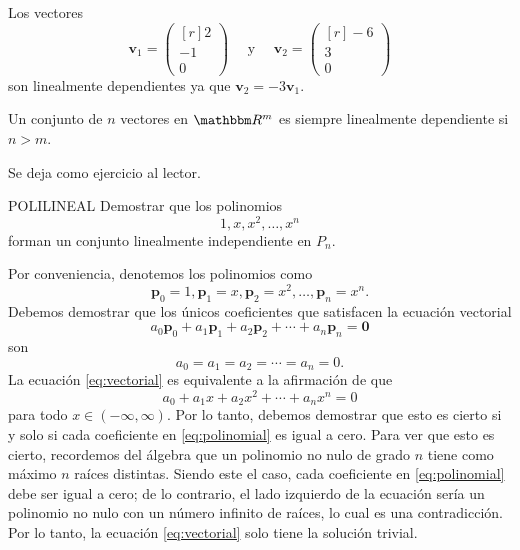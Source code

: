 \begin{examplebox}{}{}
    Los vectores
    $$\mathbf{v}_1 = \begin{pmatrix*}[r] 2 \\ -1 \\ 0 \end{pmatrix*} \quad \text{ y } \quad \mathbf{v}_2 = \begin{pmatrix*}[r] -6 \\ 3 \\ 0 \end{pmatrix*}$$
    son linealmente dependientes ya que $\mathbf{v}_2 = -3\mathbf{v}_1$.
\end{examplebox}

\begin{theorem}{}{}
    Un conjunto de $n$ vectores en $\RR[m]$ es siempre linealmente dependiente si $n > m$.

    \tcblower
    \demostracion Se deja como ejercicio al lector.
\end{theorem}

\begin{examplebox}{}{POLILINEAL}
    Demostrar que los polinomios
    $$1, x, x^2, \dots, x^n$$
    forman un conjunto linealmente independiente en $P_n$.

    \tcblower
    \solucion Por conveniencia, denotemos los polinomios como
    $$\mathbf{p}_0 = 1, \mathbf{p}_1 = x, \mathbf{p}_2 = x^2, \dots, \mathbf{p}_n = x^n.$$
    Debemos demostrar que los únicos coeficientes que satisfacen la ecuación vectorial
    \begin{equation}
        a_0\mathbf{p}_0 + a_1\mathbf{p}_1 + a_2\mathbf{p}_2 + \cdots + a_n\mathbf{p}_n = \mathbf{0} \label{eq:vectorial}
    \end{equation}
    son
    $$a_0 = a_1 = a_2 = \cdots = a_n = 0.$$
    La ecuación \eqref{eq:vectorial} es equivalente a la afirmación de que
    \begin{equation}
        a_0 + a_1x + a_2x^2 + \cdots + a_nx^n = 0 \label{eq:polinomial}
    \end{equation}
    para todo $x \in (-\infty, \infty)$. Por lo tanto, debemos demostrar que esto es cierto si y solo si cada coeficiente en \eqref{eq:polinomial} es igual a cero. Para ver que esto es cierto, recordemos del álgebra que un polinomio no nulo de grado $n$ tiene como máximo $n$ raíces distintas. Siendo este el caso, cada coeficiente en \eqref{eq:polinomial} debe ser igual a cero; de lo contrario, el lado izquierdo de la ecuación sería un polinomio no nulo con un número infinito de raíces, lo cual es una contradicción. Por lo tanto, la ecuación \eqref{eq:vectorial} solo tiene la solución trivial.
\end{examplebox}

